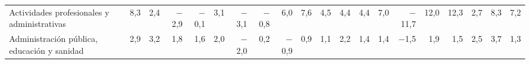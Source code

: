 \begin{tabular}{@{}>{\raggedright\arraybackslash}p{\dimexpr\anchoetq-\tabcolsep\relax}*{19}{N}@{}}
\hspace*{0.8em}Actividades profesionales y administrativas & 8{,}3 & 2{,}4 & $-$2{,}9 & $-$0{,}1 & 3{,}1 & $-$3{,}1 & $-$0{,}8 & 6{,}0 & 7{,}6 & 4{,}5 & 4{,}4 & 4{,}4 & 7{,}0 & $-$11{,}7 & 12{,}0 & 12{,}3 & 2{,}7 & 8{,}3 & 7{,}2 \\
\hspace*{0.8em}Administración pública, educación y sanidad & 2{,}9 & 3{,}2 & 1{,}8 & 1{,}6 & 2{,}0 & $-$2{,}0 & 0{,}2 & $-$0{,}9 & 0{,}9 & 1{,}1 & 2{,}2 & 1{,}4 & 1{,}4 & $-$1{,}5 & 1{,}9 & 1{,}5 & 2{,}5 & 3{,}7 & 1{,}3 \\
\bottomrule
\end{tabular}
